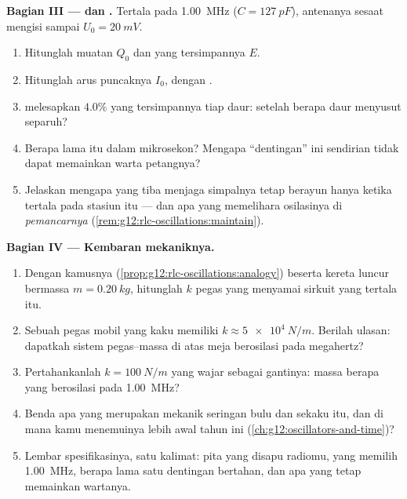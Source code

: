 \begin{problem}
\medskip
\noindent\textbf{Bagian III ---  dan .}
Tertala pada \qty{1.00}{MHz} ($C = \qty{127}{pF}$), antenanya sesaat
mengisi  sampai $U_0 = \qty{20}{mV}$.
\begin{enumerate}[resume]
  \item Hitunglah muatan $Q_0$ dan  yang tersimpannya $E$.
  \item Hitunglah arus puncaknya $I_0$, dengan .
  \item {}  melesapkan $4.0\%$  yang tersimpannya
        tiap daur: setelah berapa daur  menyusut separuh?
  \item Berapa lama itu dalam mikrosekon? Mengapa ``dentingan'' ini
        sendirian tidak dapat memainkan warta petangnya?
  \item Jelaskan mengapa  yang tiba menjaga simpalnya tetap berayun hanya
        ketika tertala pada stasiun itu --- dan apa yang memelihara
        osilasinya di \emph{pemancarnya}
        (\cref{rem:g12:rlc-oscillations:maintain}).
\end{enumerate}

\medskip
\noindent\textbf{Bagian IV --- Kembaran mekaniknya.}
\begin{enumerate}[resume]
  \item Dengan kamusnya (\cref{prop:g12:rlc-oscillations:analogy})
        beserta kereta luncur bermassa $m = \qty{0.20}{kg}$, hitunglah
         $k$ pegas yang menyamai sirkuit yang tertala itu.
  \item Sebuah pegas mobil yang kaku memiliki $k \approx \qty{5e4}{N/m}$. Berilah ulasan:
        dapatkah sistem pegas--massa di atas meja berosilasi pada megahertz?
  \item Pertahankanlah $k = \qty{100}{N/m}$ yang wajar sebagai gantinya: massa berapa
        yang berosilasi pada \qty{1.00}{MHz}?
  \item Benda  apa yang merupakan  mekanik seringan bulu dan
        sekaku itu, dan di mana kamu menemuinya lebih awal tahun
        ini (\cref{ch:g12:oscillators-and-time})?
  \item Lembar spesifikasinya, satu kalimat: pita yang disapu radiomu, 
        yang memilih \qty{1.00}{MHz}, berapa lama satu dentingan
        bertahan, dan apa yang tetap memainkan wartanya.
\end{enumerate}
\end{problem}

